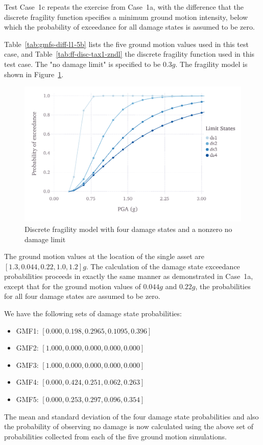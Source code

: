 Test Case~1c repeats the exercise from Case~1a, with the difference that the discrete fragility function specifies a minimum ground motion intensity, below which the probability of exceedance for all damage states is assumed to be zero.



Table~\ref{tab:gmfs-diff-l1-5b} lists the five ground motion values used in this test case, and Table~\ref{tab:ff-disc-tax1-zndl} the discrete fragility function used in this test case. The "no damage limit" is specified to be $0.3 g$.  The fragility model is shown in Figure~\ref{fig:ff-disc-tax1-nzndl}.

\begin{figure}[htbp]
\centering
\includegraphics[width=12cm]{qareport/figures/fig-ff-disc-tax1-nzndl}
\caption{Discrete fragility model with four damage states and a nonzero no damage limit}
\label{fig:ff-disc-tax1-nzndl}
\end{figure}

The ground motion values at the location of the single asset are $[1.3, 0.044, 0.22, 1.0, 1.2] g$. The calculation of the damage state exceedance probabilities proceeds in exactly the same manner as demonstrated in Case~1a, except that for the ground motion values of $0.044 g$ and $0.22 g$, the probabilities for all four damage states are assumed to be zero.

We have the following sets of damage state probabilities:

\begin{itemize}
	\item GMF1: $[0.000, 0.198, 0.2965, 0.1095, 0.396]$
	\item GMF2: $[1.000, 0.000, 0.000, 0.000, 0.000]$
	\item GMF3: $[1.000, 0.000, 0.000, 0.000, 0.000]$
	\item GMF4: $[0.000, 0.424, 0.251, 0.062, 0.263]$
	\item GMF5: $[0.000, 0.253, 0.297, 0.096, 0.354]$
\end{itemize}

The mean and standard deviation of the four damage state probabilities and also the probability of observing no damage is now calculated using the above set of probabilities collected from each of the five ground motion simulations.